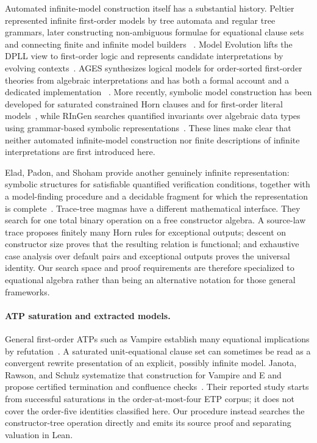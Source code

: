 \documentclass[runningheads]{llncs}
\begin{document}
Automated infinite-model construction itself has a substantial history.
Peltier represented infinite first-order models by tree automata and regular
tree grammars, later constructing non-ambiguous formulae for equational clause
sets and connecting finite and infinite model builders
~\cite{Peltier1997,Peltier2003,Peltier2008}.  Model Evolution lifts the DPLL
view to first-order logic and represents candidate interpretations by evolving
contexts~\cite{BaumgartnerTinelli2008}.  AGES synthesizes logical models for
order-sorted first-order theories from algebraic interpretations and has both
a formal account and a dedicated implementation
~\cite{GutierrezLucas2018,GutierrezLucas2019}.  More recently, symbolic model
construction has been developed for saturated constrained Horn clauses and
for first-order literal models~\cite{BrombergerEtAl2023,BrombergerEtAl2024},
while RInGen searches quantified invariants over algebraic data types using
grammar-based symbolic representations~\cite{KostyukovEtAl2021}.  These lines
make clear that neither automated infinite-model construction nor finite
descriptions of infinite interpretations are first introduced here.

Elad, Padon, and Shoham provide another genuinely infinite representation:
symbolic structures for satisfiable quantified verification conditions,
together with a model-finding procedure and a decidable fragment for which the
representation is complete~\cite{EladPadonShoham2024}.  Trace-tree magmas have
a different mathematical interface.  They search for one total binary
operation on a free constructor algebra.  A source-law trace proposes finitely
many Horn rules for exceptional outputs; descent on constructor size proves
that the resulting relation is functional; and exhaustive case analysis over
default pairs and exceptional outputs proves the universal identity.  Our
search space and proof requirements are therefore specialized to equational
algebra rather than being an alternative notation for those general
frameworks.

\paragraph{ATP saturation and extracted models.}
General first-order ATPs such as Vampire establish many equational implications
by refutation~\cite{KovacsVoronkov2013,Janota2025}.  A saturated unit-equational
clause set can sometimes be read as a convergent rewrite presentation of an
explicit, possibly infinite model.  Janota, Rawson, and Schulz systematize that
construction for Vampire and E and propose certified termination and
confluence checks~\cite{JanotaRawsonSchulz2026}.  Their reported study starts
from successful saturations in the order-at-most-four ETP corpus; it does not
cover the order-five identities classified here.  Our procedure instead
searches the constructor-tree operation directly and emits its source proof
and separating valuation in Lean.
\end{document}
